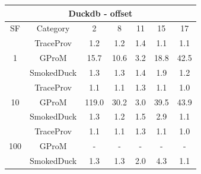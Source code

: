 \begin{tabular}{|c|c|c|c|c|c|c|}
\hline
\multicolumn{7}{c}{Duckdb - offset} \\
\hline
SF & Category & 2 & 8 & 11 & 15 & 17 \\  
 \hline 
 \multirow{3}{*}{1} & TraceProv & 1.2 & 1.2 & 1.4 & 1.1 & 1.1 \\  
 \cline{2-7} 
  & GProM & 15.7 & 10.6 & 3.2 & 18.8 & 42.5 \\  
 \cline{2-7} 
  & SmokedDuck & 1.3 & 1.3 & 1.4 & 1.9 & 1.2 \\  
 \hline 
 \multirow{3}{*}{10} & TraceProv & 1.1 & 1.1 & 1.3 & 1.1 & 1.0 \\  
 \cline{2-7} 
  & GProM & 119.0 & 30.2 & 3.0 & 39.5 & 43.9 \\  
 \cline{2-7} 
  & SmokedDuck & 1.3 & 1.2 & 1.5 & 2.9 & 1.1 \\  
 \hline 
 \multirow{3}{*}{100} & TraceProv & 1.1 & 1.1 & 1.3 & 1.1 & 1.0 \\  
 \cline{2-7} 
  & GProM & - & - & - & - & - \\  
 \cline{2-7} 
  & SmokedDuck & 1.3 & 1.3 & 2.0 & 4.3 & 1.1 \\ 
\hline
\end{tabular}
